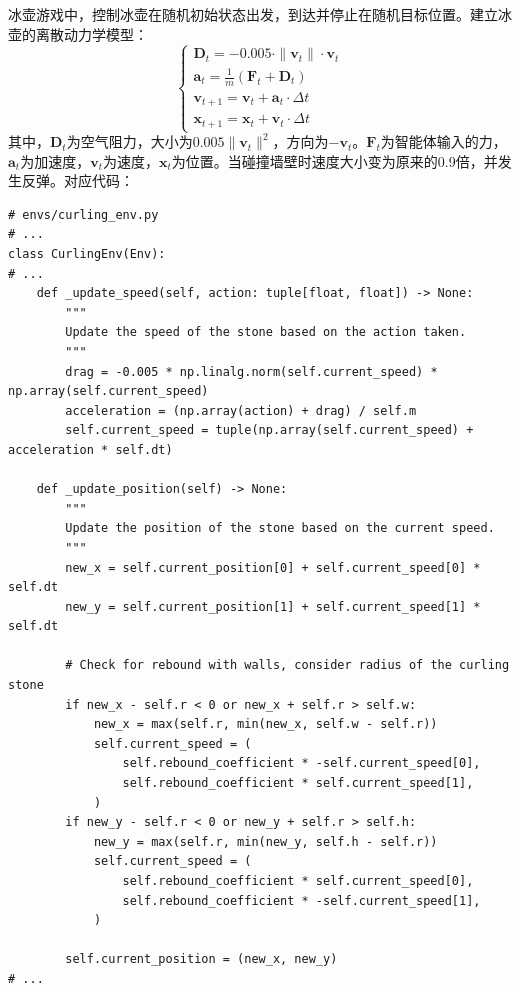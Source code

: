 \documentclass[12pt,a4paper]{article}
\begin{document}
冰壶游戏中，控制冰壶在随机初始状态出发，到达并停止在随机目标位置。建立冰壶的离散动力学模型：
\begin{equation}
    \begin{cases}
    \mathbf{D}_t = -0.005 \cdot \|\mathbf{v}_t\| \cdot \mathbf{v}_t \\
    \mathbf{a}_t = \frac{1}{m} \left( \mathbf{F}_t + \mathbf{D}_t \right) \\
    \mathbf{v}_{t+1} = \mathbf{v}_t + \mathbf{a}_t \cdot \Delta t \\
    \mathbf{x}_{t+1} = \mathbf{x}_t + \mathbf{v}_t \cdot \Delta t
    \end{cases}
\end{equation}
其中，$\mathbf{D}_t$为空气阻力，大小为$0.005\|\mathbf{v}_t\|^{2}$，方向为$-\mathbf{v}_t$。$\mathbf{F}_t$为智能体输入的力，$\mathbf{a}_t$为加速度，$\mathbf{v}_t$为速度，$\mathbf{x}_t$为位置。当碰撞墙壁时速度大小变为原来的0.9倍，并发生反弹。对应代码：
\begin{lstlisting}
# envs/curling_env.py
# ...
class CurlingEnv(Env):
# ...
    def _update_speed(self, action: tuple[float, float]) -> None:
        """
        Update the speed of the stone based on the action taken.
        """
        drag = -0.005 * np.linalg.norm(self.current_speed) * np.array(self.current_speed)
        acceleration = (np.array(action) + drag) / self.m
        self.current_speed = tuple(np.array(self.current_speed) + acceleration * self.dt)

    def _update_position(self) -> None:
        """
        Update the position of the stone based on the current speed.
        """
        new_x = self.current_position[0] + self.current_speed[0] * self.dt
        new_y = self.current_position[1] + self.current_speed[1] * self.dt

        # Check for rebound with walls, consider radius of the curling stone
        if new_x - self.r < 0 or new_x + self.r > self.w:
            new_x = max(self.r, min(new_x, self.w - self.r))
            self.current_speed = (
                self.rebound_coefficient * -self.current_speed[0],
                self.rebound_coefficient * self.current_speed[1],
            )
        if new_y - self.r < 0 or new_y + self.r > self.h:
            new_y = max(self.r, min(new_y, self.h - self.r))
            self.current_speed = (
                self.rebound_coefficient * self.current_speed[0],
                self.rebound_coefficient * -self.current_speed[1],
            )

        self.current_position = (new_x, new_y)
# ...
\end{lstlisting}
\end{document}
